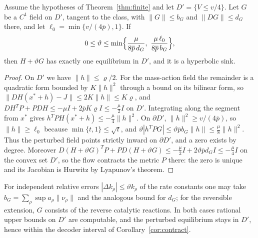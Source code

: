 \begin{proposition}\label{prop:robust}
Assume the hypotheses of Theorem~\textup{\ref{thm:finite}} and let
\(D'=\{V\le v/4\}\). Let \(G\) be a \(C^1\) field on \(D'\), tangent to the class, with
\(\|G\|\le b_G\) and \(\|DG\|\le d_G\) there, and let
\(\ell_0=\min\{v/(4\overline p),1\}\). If
\begin{equation}\label{eq:robust}
 0\le\vartheta\le\min\Bigl\{\frac{\mu}{8\overline p\,d_G},\ \frac{\mu\,\ell_0}{8\overline p\,b_G}\Bigr\},
\end{equation}
then \(H+\vartheta G\) has exactly one equilibrium in \(D'\), and it is a hyperbolic sink.
\end{proposition}
\begin{proof}
On \(D'\) we have \(\|h\|\le\varrho/2\). For the mass-action field the remainder is a
quadratic form bounded by \(K\|h\|^2\) through a bound on its bilinear form, so
\(\|DH(x^*+h)-J\|\le2K\|h\|\le K\varrho\), and
\(DH^TP+PDH\le-\mu I+2\overline pK\varrho I\le-\tfrac\mu2I\) on \(D'\). Integrating along the
segment from \(x^*\) gives \(h^TPH(x^*+h)\le-\tfrac\mu4\|h\|^2\). On \(\partial D'\),
\(\|h\|^2\ge v/(4\overline p)\), so \(\|h\|\ge\ell_0\) because \(\min\{t,1\}\le\sqrt t\), and
\(\vartheta|h^TPG|\le\vartheta\overline pb_G\|h\|\le\tfrac\mu8\|h\|^2\). Thus the perturbed
field points strictly inward on \(\partial D'\), and a zero exists by degree. Moreover
\(D(H+\vartheta G)^TP+PD(H+\vartheta G)\le-\tfrac\mu2I+2\vartheta\overline pd_GI\le-\tfrac\mu4I\)
on the convex set \(D'\), so the flow contracts the metric \(P\) there: the zero is unique and
its Jacobian is Hurwitz by Lyapunov's theorem.
\end{proof}
For independent relative errors \(|\Delta k_\rho|\le\vartheta k_\rho\) of the rate constants one
may take \(b_G=\sum_\rho\sup a_\rho\|\nu_\rho\|\) and the analogous bound for \(d_G\); for the
reversible extension, \(G\) consists of the reverse catalytic reactions. In both cases rational
upper bounds on \(D'\) are computable, and the perturbed equilibrium stays in \(D'\), hence
within the decoder interval of Corollary~\ref{cor:contract}.
